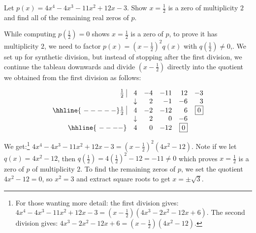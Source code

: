 \begin{example}  Let $p(x) = 4x^4-4x^3-11x^2+12x-3$. Show $x=\frac{1}{2}$ is a zero of multiplicity $2$ and find all of the remaining real zeros of $p$.

\end{example}

\begin{exampleSol}
While computing $p\left(\frac{1}{2} \right) = 0$ shows $x=\frac{1}{2}$  is a zero of $p$, to prove it has multiplicity $2$, we need to factor $p(x) = \left(x - \frac{1}{2}\right)^2 q(x)$ with $q\left( \frac{1}{2} \right) \neq 0$,.   We set up for synthetic division, but instead of stopping after the first division, we continue the tableau downwards and divide $\left(x - \frac{1}{2}\right)$ directly into the quotient we obtained from the first division as follows:

\[\begin{array}{rrrrrr}
 \frac{1}{2} \, \, \vline& 4 & -4 & -11  & 12 & -3 \\

   & \downarrow &  2  &  -1  & -6 & 3\\ \hhline{~-----} 
   
  \frac{1}{2} \, \, \vline&  4  &   -2  & -12 & 6 &  \fbox{$0$}  \\
    
      & \downarrow &  2  &  0  & -6 &\\ \hhline{~----} 
      
       & 4  &   0  & -12 & \fbox{0} &   \\  



\end{array}\]

\setlength\arraycolsep{5pt}
\setlength\extrarowheight{0pt}

We get:\footnote{For those wanting more detail:  the first division gives:  $4x^4-4x^3-11x^2+12x-3=\left(x-\frac{1}{2}\right) \left(4x^3-2x^2-12x+6\right)$.  The second division gives: $4x^3-2x^2-12x+6=\left(x-\frac{1}{2}\right)\left(4x^2-12\right)$.}   $4x^4-4x^3-11x^2+12x-3 = \left(x-\frac{1}{2}\right)^2\left(4x^2-12\right)$.  Note if we let $q(x) = 4x^2-12$, then $q\left(\frac{1}{2} \right) = 4\left(\frac{1}{2} \right)^2 - 12 = -11 \neq 0$  which proves $x = \frac{1}{2}$ is a zero of $p$ of multiplicity $2$.   To find the remaining zeros of $p$, we set the quotient $4x^2-12=0$, so $x^2 = 3$ and extract square roots to get $x = \pm \sqrt{3}$. 

\end{exampleSol} 

